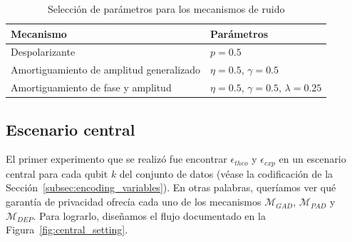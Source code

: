 \documentclass{ieeeaccess}
\begin{document}
\begin{table}[H]
  \caption{Selección de parámetros para los mecanismos de ruido}
  \label{tab:noise_params}
  \centering
  \begin{tabular}{ll}
    \toprule
    Mecanismo & Parámetros\\
    \midrule
    Despolarizante & $p = 0.5$ \\
    Amortiguamiento de amplitud generalizado & $\eta = 0.5$, $\gamma = 0.5$ \\
    Amortiguamiento de fase y amplitud & $\eta = 0.5$, $\gamma = 0.5$, $\lambda = 0.25$ \\
    \bottomrule
  \end{tabular}
\end{table}

\subsection{Escenario central}
\label{subsec:experiment_central_setting}

El primer experimento que se realizó fue encontrar $\epsilon_{theo}$ y $\epsilon_{exp}$ en un escenario central para cada qubit $k$ del conjunto de datos (véase la codificación de la Sección~\ref{subsec:encoding_variables}). En otras palabras, queríamos ver qué garantía de privacidad ofrecía cada uno de los mecanismos $\mathcal{M}_{GAD}$, $\mathcal{M}_{PAD}$ y $\mathcal{M}_{DEP}$. Para lograrlo, diseñamos el flujo documentado en la Figura~\ref{fig:central_setting}.
\end{document}
